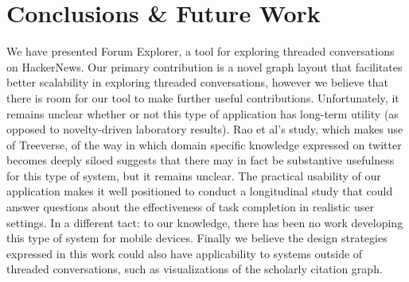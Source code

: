 \documentclass{egpubl}
\begin{document}
\section{Conclusions \& Future Work}
We have presented Forum Explorer, a tool for exploring threaded conversations on HackerNews. 
%
Our primary contribution is a novel graph layout that facilitates better scalability in exploring threaded conversations, however we believe that there is room for our tool to make further useful contributions.
%
Unfortunately, it remains unclear whether or not this type of application has long-term utility (as opposed to novelty-driven laboratory results).
%
%
Rao et al's study, which makes use of Treeverse, of the way in which domain specific knowledge expressed on twitter becomes deeply siloed suggests that there may in fact be substantive usefulness for this type of system, but it remains unclear\cite{twittercanoes}.
%
%
The practical usability of our application makes it well positioned to conduct a longitudinal study that could answer questions about the effectiveness of task completion in realistic user settings.
%
In a different tact: to our knowledge, there has been no work developing this type of system for mobile devices.
%
Finally we believe the design strategies expressed in this work could also have applicability to systems outside of threaded conversations, such as visualizations of the scholarly citation graph.










%



\end{document}
